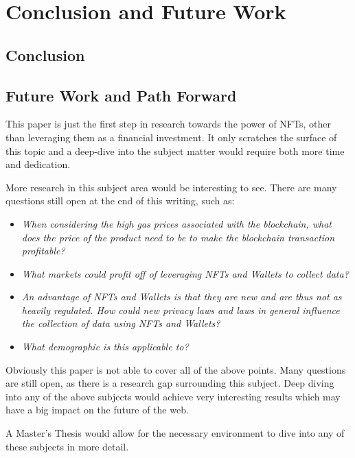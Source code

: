 \chapter{Conclusion and Future Work}
\label{ch:conclusion}

%
%
\section{Conclusion}
\label{sec:conclusion:conclusion}


%
%
\section{Future Work and Path Forward}
\label{sec:conclusion:futureWork}
This paper is just the first step in research towards the power of NFTs, other than leveraging them as a financial investment. It only scratches the surface of this topic and a deep-dive into the subject matter would require both more time and dedication.

More research in this subject area would be interesting to see. There are many questions still open at the end of this writing, such as:
\begin{itemize}
	\item \textit{When considering the high gas prices associated with the blockchain, what does the price of the product need to be to make the blockchain transaction profitable?}
	\item \textit{What markets could profit off of leveraging NFTs and Wallets to collect data?}
	\item \textit{An advantage of NFTs and Wallets is that they are new and are thus not as heavily regulated. How could new privacy laws and laws in general influence the collection of data using NFTs and Wallets?}
	\item \textit{What demographic is this applicable to?}
\end{itemize}

Obviously this paper is not able to cover all of the above points. Many questions are still open, as there is a research gap surrounding this subject. Deep diving into any of the above subjects would achieve very interesting results which may have a big impact on the future of the web.

A Master's Thesis would allow for the necessary environment to dive into any of these subjects in more detail.